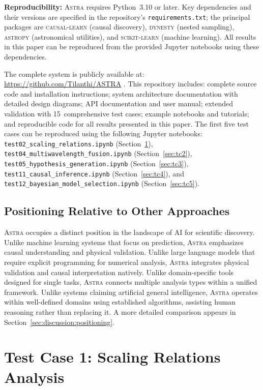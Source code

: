 \documentclass[usenatbib]{rasti}
\newcommand{\astra}{\textsc{Astra}\xspace}
\begin{document}
\textbf{Reproducibility:}
\astra requires Python~3.10 or later.
Key dependencies and their versions are specified in the repository's \texttt{requirements.txt}; the principal packages are \textsc{causal-learn} (causal discovery), \textsc{dynesty} (nested sampling), \textsc{astropy} (astronomical utilities), and \textsc{scikit-learn} (machine learning).
All results in this paper can be reproduced from the provided Jupyter notebooks using these dependencies.

The complete system is publicly available at: \url{https://github.com/Tilanthi/ASTRA} \citep{White2026}.
This repository includes: complete source code and installation instructions; system architecture documentation with detailed design diagrams; API documentation and user manual; extended validation with 15~comprehensive test cases; example notebooks and tutorials; and reproducible code for all results presented in this paper.
The first five test cases can be reproduced using the following Jupyter notebooks:
\texttt{test02\_scaling\_relations.ipynb} (Section~\ref{sec:tc1}),
\texttt{test04\_multiwavelength\_fusion.ipynb} (Section~\ref{sec:tc2}),
\texttt{test05\_hypothesis\_generation.ipynb} (Section~\ref{sec:tc3}),
\texttt{test11\_causal\_inference.ipynb} (Section~\ref{sec:tc4}), and
\texttt{test12\_bayesian\_model\_selection.ipynb} (Section~\ref{sec:tc5}).

\subsection{Positioning Relative to Other Approaches}
\label{sec:methods:positioning}

\astra occupies a distinct position in the landscape of AI for scientific discovery.
Unlike machine learning systems that focus on prediction, \astra emphasizes causal understanding and physical validation.
Unlike large language models that require explicit programming for numerical analysis, \astra integrates physical validation and causal interpretation natively.
Unlike domain-specific tools designed for single tasks, \astra connects multiple analysis types within a unified framework.
Unlike systems claiming artificial general intelligence, \astra operates within well-defined domains using established algorithms, assisting human reasoning rather than replacing it.
A more detailed comparison appears in Section~\ref{sec:discussion:positioning}.

\section{Test Case 1: Scaling Relations Analysis}
\label{sec:tc1}
\end{document}
